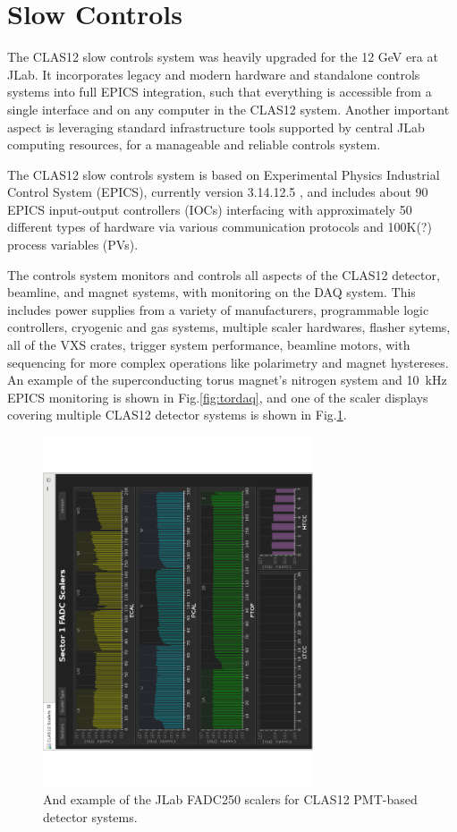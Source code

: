 \section{Slow Controls}

The CLAS12 slow controls system was heavily upgraded for the 12 GeV era at JLab.  It incorporates legacy and modern hardware and standalone controls systems into full EPICS integration, such that everything is accessible from a single interface and on any computer in the CLAS12 system.  Another important aspect is leveraging standard infrastructure tools supported by central JLab computing resources, for a manageable and reliable controls system.

The CLAS12 slow controls system is based on Experimental Physics Industrial Control System (EPICS), currently version 3.14.12.5 \cite{epics-website}, and includes about 90 EPICS input-output controllers (IOCs) interfacing with approximately 50 different types of hardware via various communication protocols and 100K(?) process variables (PVs).

The controls system monitors and controls all aspects of the CLAS12 detector, beamline, and magnet systems, with monitoring on the DAQ system.  This includes power supplies from a variety of manufacturers, programmable logic controllers, cryogenic and gas systems, multiple scaler hardwares, flasher sytems, all of the VXS crates, trigger system performance, beamline motors, with sequencing for more complex operations like polarimetry and magnet hystereses.  An example of the superconducting torus magnet's nitrogen system and 10~kHz EPICS monitoring is shown in Fig.\ref{fig:tordaq}, and one of the scaler displays covering multiple CLAS12 detector systems is shown in Fig.\ref{fig:jlabscalers}.

\begin{figure}[htbp]\centering
\includegraphics[width=8cm]{img/fd-scalers}
\caption{And example of the JLab FADC250 scalers for CLAS12 PMT-based detector systems.\label{fig:jlabscalers}}
\end{figure}

